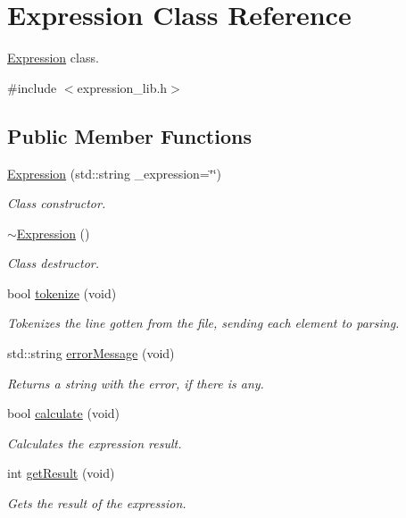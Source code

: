 \hypertarget{class_expression}{}\section{Expression Class Reference}
\label{class_expression}


\hyperlink{class_expression}{Expression} class.  




{\ttfamily \#include $<$expression\+\_\+lib.\+h$>$}

\subsection*{Public Member Functions}
\begin{DoxyCompactItemize}
\item 
\hyperlink{class_expression_a9468e945e84cd6f942d7f44b2629fe03}{Expression} (std\+::string \+\_\+expression=\char`\"{}\char`\"{})
\begin{DoxyCompactList}\small\item\em Class constructor. \end{DoxyCompactList}\item 
\hyperlink{class_expression_a3e99570b177da619eeb2c5787cbb148e}{$\sim$\+Expression} ()
\begin{DoxyCompactList}\small\item\em Class destructor. \end{DoxyCompactList}\item 
bool \hyperlink{class_expression_ae0d0eaddc8706c19f522cb146ede437a}{tokenize} (void)
\begin{DoxyCompactList}\small\item\em Tokenizes the line gotten from the file, sending each element to parsing. \end{DoxyCompactList}\item 
std\+::string \hyperlink{class_expression_a3929c5947ded6ab6912b0a164453aab6}{error\+Message} (void)
\begin{DoxyCompactList}\small\item\em Returns a string with the error, if there is any. \end{DoxyCompactList}\item 
bool \hyperlink{class_expression_a0eb085621d093a3b71110221469aa010}{calculate} (void)
\begin{DoxyCompactList}\small\item\em Calculates the expression result. \end{DoxyCompactList}\item 
int \hyperlink{class_expression_a73ec06ed06029cff2841d720c99e25da}{get\+Result} (void)
\begin{DoxyCompactList}\small\item\em Gets the result of the expression. \end{DoxyCompactList}\end{DoxyCompactItemize}


